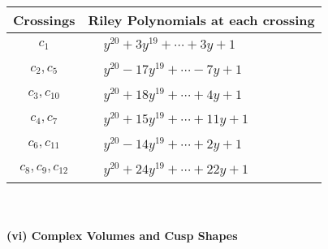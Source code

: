 \documentclass[1p]{elsarticle_modified}
\theoremstyle{definition}
\begin{document}
\begin{tabular}{m{50pt}|m{274pt}}
Crossings & \hspace{64pt}Riley Polynomials at each crossing \\
\hline $$\begin{aligned}c_{1}\end{aligned}$$&$\begin{aligned}
&y^{20}+3 y^{19}+\cdots+3 y+1
\end{aligned}$\\
\hline $$\begin{aligned}c_{2},c_{5}\end{aligned}$$&$\begin{aligned}
&y^{20}-17 y^{19}+\cdots-7 y+1
\end{aligned}$\\
\hline $$\begin{aligned}c_{3},c_{10}\end{aligned}$$&$\begin{aligned}
&y^{20}+18 y^{19}+\cdots+4 y+1
\end{aligned}$\\
\hline $$\begin{aligned}c_{4},c_{7}\end{aligned}$$&$\begin{aligned}
&y^{20}+15 y^{19}+\cdots+11 y+1
\end{aligned}$\\
\hline $$\begin{aligned}c_{6},c_{11}\end{aligned}$$&$\begin{aligned}
&y^{20}-14 y^{19}+\cdots+2 y+1
\end{aligned}$\\
\hline $$\begin{aligned}c_{8},c_{9},c_{12}\end{aligned}$$&$\begin{aligned}
&y^{20}+24 y^{19}+\cdots+22 y+1
\end{aligned}$\\
\hline
\end{tabular}\\~\\
\newpage\flushleft \textbf{(vi) Complex Volumes and Cusp Shapes}
\end{document}
